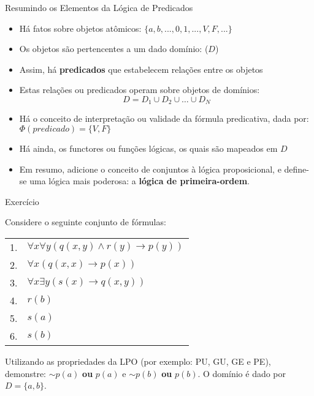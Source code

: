 \begin{frame}[t]{Resumindo os Elementos da Lógica de Predicados}
	\begin{itemize} 
	\itemsep 0.3cm
	\item Há fatos sobre objetos atômicos: $\{a, b, ..., 0, 1, ...,V, F, ...\}$
	\item Os objetos são pertencentes a um dado domínio: ($D$)
	\item Assim,  há {\bf predicados} que  estabelecem relações entre os objetos
	
	\item Estas relações ou predicados operam sobre objetos de domínios: $$D = D_1 \cup D_2 \cup\ldots\cup D_N$$
	\item Há o conceito de interpretação ou validade da fórmula predicativa, dada por: $\Phi (predicado) = \{V, F\}$
  \item Há ainda, os functores ou funções lógicas, os quais são mapeados em $D$

\item Em resumo, adicione o conceito de conjuntos à lógica proposicional, e define-se
uma lógica mais poderosa: a {\bf lógica de primeira-ordem}.

	\end{itemize}
\end{frame}


\begin{frame}[t]{Exercício}

Considere o seguinte conjunto de f\'ormulas: 

\vspace{13pt}

\begin{tabular}{ll}
 \hline \hline
1. &  $\forall x\forall y (q(x,y) \wedge r(y) \rightarrow p(y)) $ \\
2. &  $\forall x  (q(x,x) \rightarrow p(x))  $ \\
3. &  $\forall x \exists y ( s(x) \rightarrow q(x,y)) $ \\
4. &  $r(b)$ \\ 
5. &  $s(a)$ \\
6. &  $s(b)$  \\ 
\hline \hline
\end{tabular}

\vspace{13pt}

Utilizando as propriedades da LPO (por exemplo: PU, GU, GE e PE), demonstre: $\sim p(a)$ \textbf{ ou } $p(a)$ e $\sim p(b)$ \textbf{ ou } $p(b)$. O domínio é dado por $D=\{a,b\}$. 


\end{frame}

